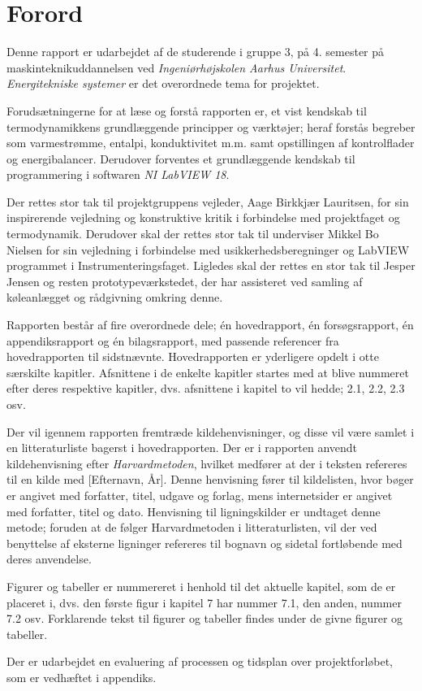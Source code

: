 \documentclass[../Hovedrapport.tex]{subfiles}
\begin{document}
\chapter*{Forord}       %
    \label{chap:forord}
Denne rapport er udarbejdet af de studerende i gruppe 3, på 4. semester på maskinteknikuddannelsen ved \textit{Ingeniørhøjskolen Aarhus Universitet}. \textit{Energitekniske systemer} er det overordnede tema for projektet.

Forudsætningerne for at læse og forstå rapporten er, et vist kendskab til termodynamikkens grundlæggende principper og værktøjer; heraf forstås begreber som varmestrømme, entalpi, konduktivitet m.m. samt opstillingen af kontrolflader og energibalancer. Derudover forventes et grundlæggende kendskab til programmering i softwaren \textit{NI LabVIEW 18}. 

Der rettes stor tak til projektgruppens vejleder, Aage Birkkjær Lauritsen, for sin inspirerende vejledning og konstruktive kritik i forbindelse med projektfaget og termodynamik. Derudover skal der rettes stor tak til underviser Mikkel Bo Nielsen for sin vejledning i forbindelse med usikkerhedsberegninger og LabVIEW programmet i Instrumenteringsfaget. Ligledes skal der rettes en stor tak til Jesper Jensen og resten prototypeværkstedet, der har assisteret ved samling af køleanlægget og rådgivning omkring denne.

Rapporten består af fire overordnede dele; én hovedrapport, én forsøgsrapport, én appendiksrapport og én bilagsrapport, med passende referencer fra hovedrapporten til sidstnævnte. Hovedrapporten er yderligere opdelt i otte særskilte kapitler. Afsnittene i de enkelte kapitler startes med at blive nummeret efter deres respektive kapitler, dvs. afsnittene i kapitel to vil hedde; 2.1, 2.2, 2.3 osv.

Der vil igennem rapporten fremtræde kildehenvisninger, og disse vil være samlet i en litteraturliste bagerst i hovedrapporten. Der er i rapporten anvendt kildehenvisning efter \textit{Harvardmetoden}, hvilket medfører at der i teksten refereres til en kilde med [Efternavn, År]. Denne henvisning fører til kildelisten, hvor bøger er angivet med forfatter, titel, udgave og forlag, mens internetsider er angivet med forfatter, titel og dato. Henvisning til ligningskilder er undtaget denne metode; foruden at de følger Harvardmetoden i litteraturlisten, vil der ved benyttelse af eksterne ligninger refereres til bognavn og sidetal fortløbende med deres anvendelse.

Figurer og tabeller er nummereret i henhold til det aktuelle kapitel, som de er placeret i, dvs. den første figur i kapitel 7 har nummer 7.1, den anden, nummer 7.2 osv. Forklarende tekst til figurer og tabeller findes under de givne figurer og tabeller. 

Der er udarbejdet en evaluering af processen og tidsplan over projektforløbet, som er vedhæftet i appendiks.  
\clearpage
\end{document}
